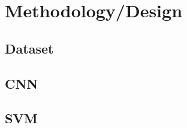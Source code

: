 \section{Methodology/Design}
\label{sec:methodology}

\subsection{Dataset}


\subsection{CNN}

\subsection{SVM}


